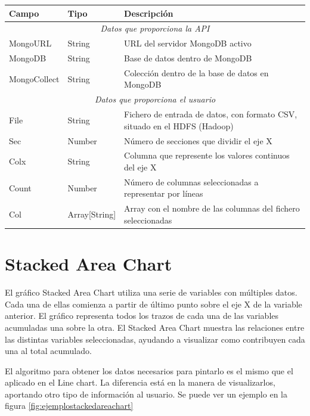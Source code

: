 \begin{tabular}{|l|l|p{7cm}|}
	\hline 
	\textbf{Campo} & \textbf{Tipo} & \textbf{Descripción} \\ 
	\hline \hline
	\multicolumn{3}{|c|}{\textit{Datos que proporciona la API}} \\
	\hline 
	MongoURL & String & URL del servidor MongoDB activo \\ 
	\hline 
	MongoDB & String & Base de datos dentro de MongoDB \\ 
	\hline 
	MongoCollect& String & Colección dentro de la base de datos en MongoDB \\ 
	\hline \hline
	\multicolumn{3}{|c|}{\textit{Datos que proporciona el usuario}} \\
	\hline 
	File & String & Fichero de entrada de datos, con formato CSV, situado en el HDFS (Hadoop) \\ 
	\hline 
	Sec & Number & Número de secciones que dividir el eje X \\ 
	\hline 
	Colx & String & Columna que represente los valores continuos del eje X \\ 
	\hline 
	Count & Number & Número de columnas seleccionadas a representar por líneas \\ 
	\hline  
	Col & Array[String] & Array con el nombre de las columnas del fichero seleccionadas \\ 
	\hline
\end{tabular} 


\section{Stacked Area Chart}
El gráfico Stacked Area Chart utiliza una serie de variables con múltiples datos. Cada una de ellas comienza a partir de último punto sobre el eje X de la variable anterior. El gráfico representa todos los trazos de cada una de las variables acumuladas una sobre la otra. El Stacked Area Chart muestra las relaciones entre las distintas variables seleccionadas, ayudando a visualizar como contribuyen cada una al total acumulado.

El algoritmo para obtener los datos necesarios para pintarlo es el mismo que el aplicado en el Line chart. La diferencia está en la manera de visualizarlos, aportando otro tipo de información al usuario. Se puede ver un ejemplo en la figura \ref{fig:ejemplostackedareachart}

